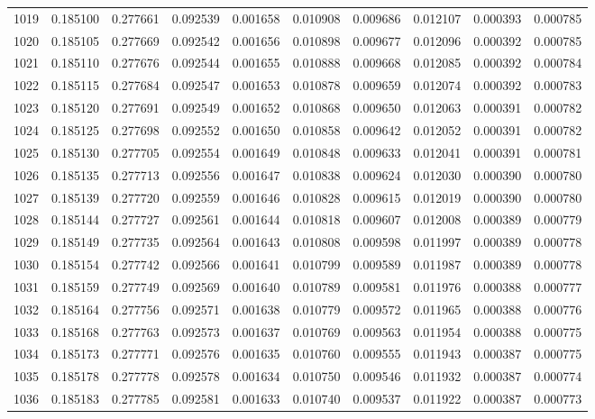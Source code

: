 \begin{tabular}{lrrrrrrrrr}
1019 & 0.185100 & 0.277661 & 0.092539 & 0.001658 & 0.010908 & 0.009686 & 0.012107 & 0.000393 & 0.000785 \\
1020 & 0.185105 & 0.277669 & 0.092542 & 0.001656 & 0.010898 & 0.009677 & 0.012096 & 0.000392 & 0.000785 \\
1021 & 0.185110 & 0.277676 & 0.092544 & 0.001655 & 0.010888 & 0.009668 & 0.012085 & 0.000392 & 0.000784 \\
1022 & 0.185115 & 0.277684 & 0.092547 & 0.001653 & 0.010878 & 0.009659 & 0.012074 & 0.000392 & 0.000783 \\
1023 & 0.185120 & 0.277691 & 0.092549 & 0.001652 & 0.010868 & 0.009650 & 0.012063 & 0.000391 & 0.000782 \\
1024 & 0.185125 & 0.277698 & 0.092552 & 0.001650 & 0.010858 & 0.009642 & 0.012052 & 0.000391 & 0.000782 \\
1025 & 0.185130 & 0.277705 & 0.092554 & 0.001649 & 0.010848 & 0.009633 & 0.012041 & 0.000391 & 0.000781 \\
1026 & 0.185135 & 0.277713 & 0.092556 & 0.001647 & 0.010838 & 0.009624 & 0.012030 & 0.000390 & 0.000780 \\
1027 & 0.185139 & 0.277720 & 0.092559 & 0.001646 & 0.010828 & 0.009615 & 0.012019 & 0.000390 & 0.000780 \\
1028 & 0.185144 & 0.277727 & 0.092561 & 0.001644 & 0.010818 & 0.009607 & 0.012008 & 0.000389 & 0.000779 \\
1029 & 0.185149 & 0.277735 & 0.092564 & 0.001643 & 0.010808 & 0.009598 & 0.011997 & 0.000389 & 0.000778 \\
1030 & 0.185154 & 0.277742 & 0.092566 & 0.001641 & 0.010799 & 0.009589 & 0.011987 & 0.000389 & 0.000778 \\
1031 & 0.185159 & 0.277749 & 0.092569 & 0.001640 & 0.010789 & 0.009581 & 0.011976 & 0.000388 & 0.000777 \\
1032 & 0.185164 & 0.277756 & 0.092571 & 0.001638 & 0.010779 & 0.009572 & 0.011965 & 0.000388 & 0.000776 \\
1033 & 0.185168 & 0.277763 & 0.092573 & 0.001637 & 0.010769 & 0.009563 & 0.011954 & 0.000388 & 0.000775 \\
1034 & 0.185173 & 0.277771 & 0.092576 & 0.001635 & 0.010760 & 0.009555 & 0.011943 & 0.000387 & 0.000775 \\
1035 & 0.185178 & 0.277778 & 0.092578 & 0.001634 & 0.010750 & 0.009546 & 0.011932 & 0.000387 & 0.000774 \\
1036 & 0.185183 & 0.277785 & 0.092581 & 0.001633 & 0.010740 & 0.009537 & 0.011922 & 0.000387 & 0.000773 \\

\end{tabular}
